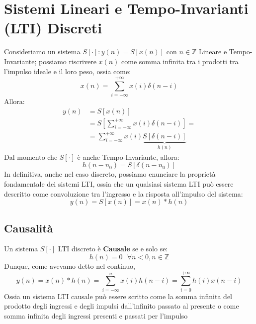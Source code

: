 \section{Sistemi Lineari e Tempo-Invarianti (LTI) Discreti}
Consideriamo un sistema $S[\cdot] : y(n) = S[x(n)]$ con $n \in \mathbb{Z}$ Lineare e Tempo-Invariante; possiamo riscrivere $x(n)$
come somma infinita tra i prodotti tra l'impulso ideale e il loro peso, ossia come:
\begin{equation*}
    x(n) = \sum_{i = -\infty}^{+\infty} x(i)\delta(n-i)
\end{equation*}
Allora:
\begin{align*}
    y(n) &= S[x(n)] \\ 
         &= S\left[\sum_{i = -\infty}^{+\infty} x(i)\delta(n-i)\right] = \\
         &=\sum_{i = -\infty}^{+\infty} x(i) \underbrace{S[\delta(n-i)]}_{h(n)}
\end{align*}
Dal momento che $S[\cdot]$ è anche Tempo-Invariante, allora:
\begin{equation*}
    h(n - n_0) = S\left[\delta(n - n_0)\right]
\end{equation*}
In definitiva, anche nel caso discreto, possiamo enunciare la proprietà fondamentale dei sistemi LTI, ossia che un qualsiasi sistema LTI
può essere descritto come convoluzione tra l'ingresso e la risposta all'impulso del sistema:
\begin{equation}
    y(n) = S[x(n)] = x(n) \ast h(n)
\end{equation}

\subsection{Causalità}
Un sistema $S[\cdot]$ LTI discreto è \textbf{Causale} se e solo se:
\begin{equation}
    h(n) = 0 \mbox{  } \forall n < 0, n \in \mathbb{Z}
\end{equation}
Dunque, come avevamo detto nel continuo,
\begin{equation}
    y(n) = x(n) \ast h(n) = \sum_{i = -\infty}^{n} x(i) h(n - i) = \sum_{i = 0}^{+\infty} h(i) x(n - i)
\end{equation}
Ossia un sistema LTI causale può essere scritto come la somma infinita del prodotto degli ingressi e degli impulsi dall'infinito passato al presente o come 
somma infinita degli ingressi presenti e passati per l'impulso

